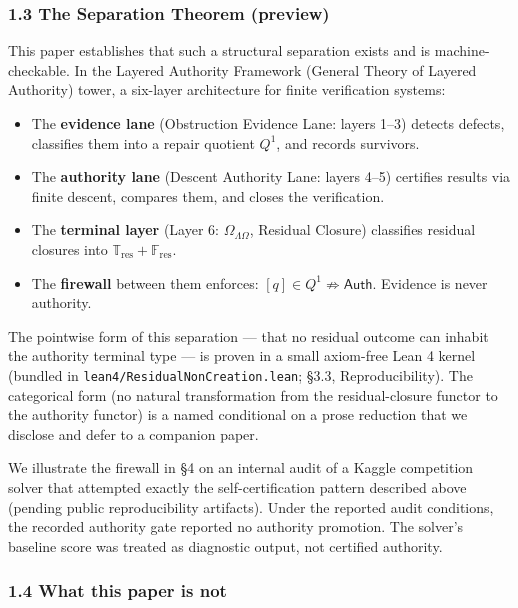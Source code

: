 \documentclass[
  10pt,
]{article}
\providecommand{\tightlist}{%
  \setlength{\itemsep}{0pt}\setlength{\parskip}{0pt}}
\providecommand{\tightlist}{%
  \setlength{\itemsep}{0pt}\setlength{\parskip}{0pt}}
\DeclareRobustCommand{\texttt}[1]{{\paperSymbolFont\nolinkurl{#1}}}
\begin{document}
\subsubsection{1.3 The Separation Theorem (preview)}\label{the-separation-theorem-preview}

This paper establishes that such a structural separation exists and is machine-checkable. In the Layered Authority Framework (General Theory of Layered Authority) tower, a six-layer architecture for finite verification systems:

\begin{itemize}
\tightlist
\item
  The \textbf{evidence lane} (Obstruction Evidence Lane: layers 1--3) detects defects, classifies them into a repair quotient \protect\hypertarget{math-E0006-0006}{}{\(Q^1\)}, and records survivors.
\item
  The \textbf{authority lane} (Descent Authority Lane: layers 4--5) certifies results via finite descent, compares them, and closes the verification.
\item
  The \textbf{terminal layer} (Layer 6: \protect\hypertarget{math-E0007-0007}{}{\(\Omega_{\Lambda\Omega}\)}, Residual Closure) classifies residual closures into \protect\hypertarget{math-E0008-0008}{}{\(\mathbb{T}_{\mathrm{res}} + \mathbb{F}_{\mathrm{res}}\)}.
\item
  The \textbf{firewall} between them enforces: \protect\hypertarget{math-E0009-0009}{}{\([q] \in Q^1 \not\Rightarrow \mathsf{Auth}\)}. Evidence is never authority.
\end{itemize}

The pointwise form of this separation --- that no residual outcome can inhabit the authority terminal type --- is proven in a small axiom-free Lean 4 kernel (bundled in \texttt{lean4/ResidualNonCreation.lean}; §3.3, Reproducibility). The categorical form (no natural transformation from the residual-closure functor to the authority functor) is a named conditional on a prose reduction that we disclose and defer to a companion paper.

We illustrate the firewall in §4 on an internal audit of a Kaggle competition solver that attempted exactly the self-certification pattern described above (pending public reproducibility artifacts). Under the reported audit conditions, the recorded authority gate reported no authority promotion. The solver's baseline score was treated as diagnostic output, not certified authority.

\subsubsection{1.4 What this paper is not}\label{what-this-paper-is-not}
\end{document}
